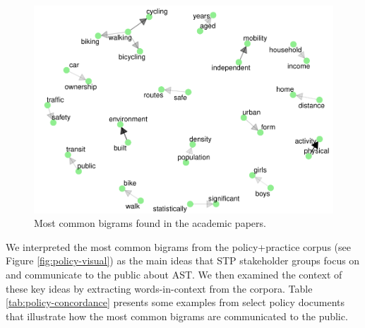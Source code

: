 \documentclass[preprint, 3p,
authoryear]{elsarticle} %
\begin{document}
\begin{figure}

{\centering \includegraphics[width=1\linewidth]{AST-Framing-Ontario_files/figure-latex/academic-visual-1} 

}

\caption{\label{fig:academic-visual}Most common bigrams found in the academic papers.}\label{fig:academic-visual}
\end{figure}

We interpreted the most common bigrams from the policy+practice corpus
(see Figure \ref{fig:policy-visual}) as the main ideas that STP
stakeholder groups focus on and communicate to the public about AST. We
then examined the context of these key ideas by extracting
words-in-context from the corpora. Table \ref{tab:policy-concordance}
presents some examples from select policy documents that illustrate how
the most common bigrams are communicated to the public.
\end{document}
